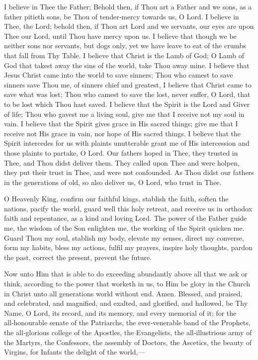 I believe in Thee the Father; Behold then, if Thou art a Father and we sons, as a father pitieth sons, be Thou of tender‑mercy towards us, O Lord. I believe in Thee, the Lord; behold then, if Thou art Lord and we servants, our eyes are upon Thee our Lord, until Thou have mercy upon us. I believe that though we be neither sons nor servants, but dogs only, yet we have leave to eat of the crumbs that fall from Thy Table. I believe that Christ is the Lamb of God; O Lamb of God that takest away the sins of the world, take Thou away mine. I believe that Jesus Christ came into the world to save sinners; Thou who camest to save sinners save Thou me, of sinners chief and greatest, I believe that Christ came to save what was lost; Thou who camest to save the lost, never suffer, O Lord, that to be lost which Thou hast saved. I believe that the Spirit is the Lord and Giver of life; Thou who gavest me a living soul, give me that I receive not my soul in vain. I believe that the Spirit gives grace in His sacred things; give me that I receive not His grace in vain, nor hope of His sacred things. I believe that the Spirit intercedes for us with plaints unutterable grant me of His intercession and those plaints to partake, O Lord. Our fathers hoped in Thee, they trusted in Thee, and Thou didst deliver them. They called upon Thee and were holpen, they put their trust in Thee, and were not confounded. As Thou didst our fathers in the generations of old, so also deliver us, O Lord, who trust in Thee.


O Heavenly King, confirm our faithful kings, stablish the faith, soften the nations, pacify the world, guard well this holy retreat, and receive us in orthodox faith and repentance, as a kind and loving Lord. The power of the Father guide me, the wisdom of the Son enlighten me, the working of the Spirit quicken me. Guard Thou my soul, stablish my body, elevate my senses, direct my converse, form my habits, bless my actions, fulfil my prayers, inspire holy thoughts, pardon the past, correct the present, prevent the future.


Now unto Him that is able to do exceeding abundantly above all that we ask or think, according to the power that worketh in us, to Him be glory in the Church in Christ unto all generations world without end. Amen. Blessed, and praised, and celebrated, and magnified, and exalted, and glorified, and hallowed, be Thy Name, O Lord, its record, and its memory, and every memorial of it; for the all‑honourable senate of the Patriarchs, the ever‑venerable band of the Prophets, the all‑glorious college of the Apostles, the Evangelists, the all‑illustrious army of the Martyrs, the Confessors, the assembly of Doctors, the Ascetics, the beauty of Virgins, for Infants the delight of the world,—

